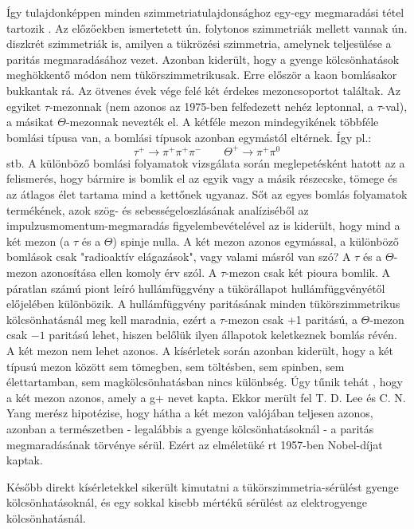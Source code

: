 \documentclass[../main.tex]{subfiles}
\begin{document}
Így tulajdonképpen minden szimmetriatulajdonsághoz egy-egy megmaradási tétel tartozik . Az előzőekben ismertetett ún. folytonos szimmetriák
mellett vannak ún. diszkrét szimmetriák is, amilyen a tükrözési szimmetria, amelynek teljesülése a paritás megmaradásához vezet. Azonban kiderült,
hogy a gyenge kölcsönhatások meghökkentő módon nem tükörszimmetrikusak. Erre először a kaon bomlásakor bukkantak rá.
Az ötvenes évek vége felé két érdekes mezoncsoportot találtak. Az egyiket $\tau$-mezonnak (nem azonos az 1975-ben felfedezett nehéz leptonnal, a $\tau$-val), a másikat $\Theta$-mezonnak nevezték el.
A kétféle mezon mindegyikének többféle bomlási típusa van, a bomlási típusok azonban egymástól eltérnek. Így pl.:
\begin{equation}
    \tau^+ \rightarrow \pi^+ \pi^+ \pi^- \qquad \Theta^+ \rightarrow \pi^+ \pi^0
\end{equation}
stb. A különböző bomlási folyamatok vizsgálata során meglepetésként hatott az a felismerés, hogy bármire is bomlik el az egyik vagy a másik részecske, tömege és az átlagos élet tartama mind a kettőnek ugyanaz. Sőt
az egyes bomlás folyamatok termékének, azok szög- és sebességeloszlásának
analíziséből az impulzusmomentum-megmaradás figyelembevételével az is
kiderült, hogy mind a két mezon (a $\tau$ és a $\Theta$) spinje nulla. A két mezon azonos egymással, a különböző bomlások csak "radioaktív elágazások", vagy
valami másról van szó? A $\tau$ és a $\Theta$-mezon azonosítása ellen komoly érv szól.
A $\tau$-mezon csak két pioura bomlik. A páratlan számú piont leíró hullámfüggvény a tükörállapot hullámfüggvényétől előjelében különbözik. A hullámfüggvény paritásának minden tükörszimmetrikus kölcsönhatásnál meg
kell maradnia, ezért a $\tau$-mezon csak +1 paritású, a $\Theta$-mezon csak $-1$ paritású lehet, hiszen belőlük ilyen állapotok keletkeznek bomlás révén. A két
mezon nem lehet azonos. A kísérletek során azonban kiderült, hogy a két
típusú mezon között sem tömegben, sem töltésben, sem spinben, sem élettartamban, sem magkölcsönhatásban nincs különbség. Úgy tűnik tehát , hogy
a két mezon azonos, amely a g+ nevet kapta. Ekkor merült fel T. D. Lee
és C. N. Yang merész hipotézise, hogy hátha a két mezon valójában teljesen
azonos, azonban a természetben - legalábbis a gyenge kölcsönhatásoknál -
a paritás megmaradásának törvénye sérül. Ezért az elméletüké rt 1957-ben
Nobel-díjat kaptak.

Később direkt kísérletekkel sikerült kimutatni a tükörszimmetria-sérülést gyenge kölcsönhatásoknál, és egy sokkal kisebb mértékű sérülést az
elektrogyenge kölcsönhatásnál.
\end{document}
